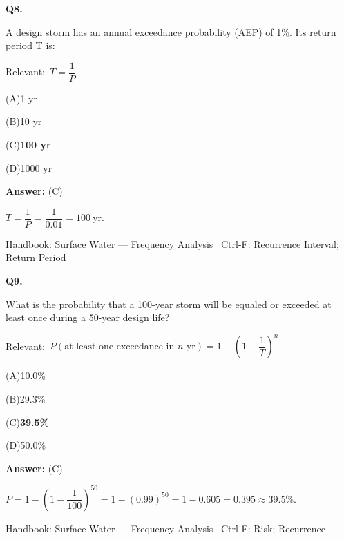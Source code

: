 \documentclass[11pt]{article}
\newcommand{\correct}[1]{\textbf{#1}\;{\color{accent}$\checkmark$}}
\newcommand{\optline}[2]{\par\noindent\hspace{1.2em}(#1)\hspace{0.6em}#2}
\begin{document}
\vspace{9pt}
\filbreak
\textbf{\color{accent}Q8.}\par\vspace{2pt}
A design storm has an annual exceedance probability (AEP) of 1\%. Its return period T is:\par\vspace{3pt}
{\small\color{soft}Relevant:}\ $T = \dfrac{1}{P}$\par\vspace{3pt}
\optline{A}{1 yr}
\optline{B}{10 yr}
\optline{C}{\correct{100 yr}}
\optline{D}{1000 yr}
\par\vspace{3pt}
\vspace{2pt}\par\noindent\colorbox{boxbg}{\parbox{\dimexpr\linewidth-2\fboxsep\relax}{%
\vspace{2pt}\textbf{Answer:} (C)\par\vspace{2pt}
{\small $T = \dfrac{1}{P} = \dfrac{1}{0.01} = 100\ \mathrm{yr}$.}\par\vspace{2pt}
{\footnotesize\color{soft}Handbook: Surface Water --- Frequency Analysis \textbullet\ Ctrl-F: Recurrence Interval; Return Period}\vspace{2pt}
}}
\vspace{9pt}
\filbreak
\textbf{\color{accent}Q9.}\par\vspace{2pt}
What is the probability that a 100-year storm will be equaled or exceeded at least once during a 50-year design life?\par\vspace{3pt}
{\small\color{soft}Relevant:}\ $P(\text{at least one exceedance in }n\text{ yr}) = 1 - \left(1 - \dfrac{1}{T}\right)^{n}$\par\vspace{3pt}
\optline{A}{10.0\%}
\optline{B}{29.3\%}
\optline{C}{\correct{39.5\%}}
\optline{D}{50.0\%}
\par\vspace{3pt}
\vspace{2pt}\par\noindent\colorbox{boxbg}{\parbox{\dimexpr\linewidth-2\fboxsep\relax}{%
\vspace{2pt}\textbf{Answer:} (C)\par\vspace{2pt}
{\small $P = 1 - \left(1 - \dfrac{1}{100}\right)^{50} = 1 - (0.99)^{50} = 1 - 0.605 = 0.395 \approx 39.5\%$.}\par\vspace{2pt}
{\footnotesize\color{soft}Handbook: Surface Water --- Frequency Analysis \textbullet\ Ctrl-F: Risk; Recurrence}\vspace{2pt}
}}
\end{document}
